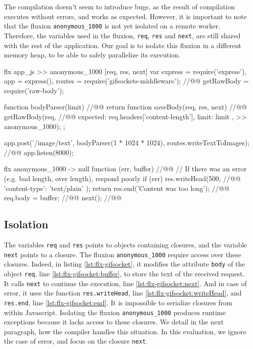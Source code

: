 The compilation doesn't seem to introduce bugs, as the result of compilation executes without errors, and works as expected.
However, it is important to note that the fluxion \texttt{anonymous\_1000} is not yet isolated on a remote worker.
Therefore, the variables used in the fluxion, \texttt{req}, \texttt{res} and \texttt{next}, are still shared with the rest of the application.
Our goal is to isolate this fluxion in a different memory heap, to be able to safely parallelize its execution.

\begin{code}[flx, caption={Compilation result of the simplified version of gifsockets-server},label={lst:flx-gifsocket}]
flx app_js
>> anonymous_1000 [req, res, next]
  var express = require('express'),
      app = express(),
      routes = require('gifsockets-middleware'); //@\label{lst:flx-gifsocket:gif-mw}@
      getRawBody = require('raw-body');

  function bodyParser(limit) { //@\label{lst:flx-gifsocket:bodyParser}@
    return function saveBody(req, res, next) { //@\label{lst:flx-gifsocket:saveBody}@
      getRawBody(req, { //@\label{lst:flx-gifsocket:getRawBody}@
        expected: req.headers['content-length'],
        limit: limit
      }, >> anonymous_1000);
    };
  }

  app.post('/image/text', bodyParser(1 * 1024 * 1024), routes.writeTextToImages); //@\label{lst:flx-gifsocket:app.post}@
  app.listen(8000);

flx anonymous_1000
-> null
  function (err, buffer) { //@\label{lst:flx-gifsocket:callback}@
    // If there was an error (e.g. bad length, over length), respond poorly
    if (err) {
      res.writeHead(500, { //@\label{lst:flx-gifsocket:writeHead}@
        'content-type': 'text/plain'
      });
      return res.end('Content was too long');  //@\label{lst:flx-gifsocket:end}@
    }
    req.body = buffer; //@\label{lst:flx-gifsocket:buffer}@
    next(); //@\label{lst:flx-gifsocket:next}@
  }
\end{code}

\subsection{Isolation}

The variables \texttt{req} and \texttt{res} points to objects containing closures, and the variable \texttt{next} points to a closure.
The fluxion \texttt{anonymous\_1000} require access over these closures.
Indeed, in listing \ref{lst:flx-gifsocket}, it modifies the attribute \texttt{body} of the object \texttt{req}, line \ref{lst:flx-gifsocket:buffer}, to store the text of the received request.
It calls \texttt{next} to continue the execution, line \ref{lst:flx-gifsocket:next}.
And in case of error, it uses the function \texttt{res.writeHead}, line \ref{lst:flx-gifsocket:writeHead}, and \texttt{res.end}, line \ref{lst:flx-gifsocket:end}.
It is impossible to serialize closures from within Javascript.
Isolating the fluxion \texttt{anonymous\_1000} produces runtime exceptions because it lacks access to these closures.
We detail in the next paragraph, how the compiler handles this situation.
In this evaluation, we ignore the case of error, and focus on the closure \texttt{next}.

